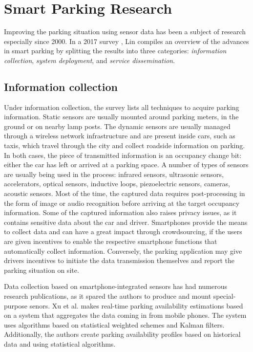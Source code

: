 \documentclass{ws-ijait}
\newcommand{\cmmnt}[1]{\ignorespaces}
\begin{document}
	\section{Smart Parking Research}
	Improving the parking situation using sensor data has been a subject of research especially since 2000. In a 2017 survey \cmmnt{survey ref + phd ref}, Lin compiles an overview of the advances in smart parking by splitting the results into three categories: \textit{information collection}, \textit{system deployment}, and \textit{service dissemination}.
	
	\subsection{Information collection}
	Under information collection, the survey lists all techniques to acquire parking information. Static sensors are usually mounted around parking meters, in the ground or on nearby lamp posts. The dynamic sensors are usually managed through a wireless network infrastructure and are present inside cars, such as taxis, which travel through the city and collect roadside information on parking. In both cases, the piece of transmitted information is an occupancy change bit: either the car has left or arrived at a parking space. A number of types of sensors are usually being used in the process: infrared sensors, ultrasonic sensors, accelerators, optical sensors, inductive loops, piezoelectric sensors, cameras, acoustic sensors. Most of the time, the captured data requires post-processing in the form of image or audio recognition before arriving at the target occupancy information. Some of the captured information also raises privacy issues, as it contains sensitive data about the car and driver. Smartphones provide the means to collect data and can have a great impact through crowdsourcing, if the users are given incentives to enable the respective smartphone functions that automatically collect information. Conversely, the parking application may give drivers incentives to initiate the data transmission themselves and report the parking situation on site. 
	
	Data collection based on smartphone-integrated sensors has had numerous research publications, as it spared the authors to produce and mount special-purpose senors. Xu et al. \cmmnt{ref xu} makes real-time parking availability estimations based on a system that aggregates the data coming in from mobile phones. The system uses algorithms based on statistical weighted schemes and Kalman filters. Additionally, the authors create parking availability profiles based on historical data and using statistical algorithms. 
	
\end{document}
